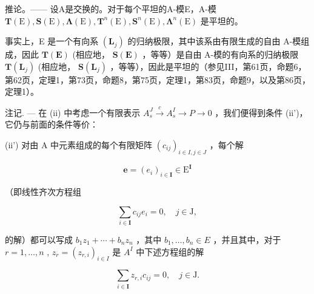 推论。—— 设A是交换的。对于每个平坦的A-模E，A-模 \(\mathbf{T}(\mathrm{E}),\mathbf{S}(\mathrm{E}),\symbf{\Lambda}(\mathrm{E}),\mathbf{T}^{n}(\mathrm{E}),\mathbf{S}^{n}(\mathrm{E}),\symbf{\Lambda}^{n}(\mathrm{E})\) 是平坦的。

事实上，E 是一个有向系 \((\mathbf{L}_{j})\) 的归纳极限，其中该系由有限生成的自由 A-模组成，因此 \(\mathbf{T}(\mathbf{E})\) (相应地， \(\mathbf{S}(\mathbf{E})\) ，等等）是自由 A-模的有向系的归纳极限 \(\mathbf{T}(\mathbf{L}_{j})\) (相应地， \(\mathbf{S}(\mathbf{L}_{j})\) ，等等），因此是平坦的（参见III，第61页，命题6，第62页，定理1，第73页，命题8，第75页，定理1，第83页，命题9，以及第86页，定理1）。

注记. --- 在 (ii) 中考虑一个有限表示 \(A_{s}^{J} \xrightarrow{c} A_{s}^{I} \to P \to 0\) ，我们便得到条件 (ii')，它仍与前面的条件等价：

(ii') 对由 A 中元素组成的每个有限矩阵 \((c_{ij})_{i\in I,j\in J}\) ，每个解

\[
\pmb {e} = (e _ {i}) _ {i \in \mathbf {I}} \in \mathrm{E} ^ {\mathbf {I}}
\]

（即线性齐次方程组

\[
\sum_ {i \in \mathbf {I}} c _ {i j} e _ {i} = 0, \quad j \in \mathrm{J},
\]

的解）都可以写成 \(b_{1}z_{1}+\cdots+b_{n}z_{n}\) ，其中 \(b_{1},\ldots,b_{n}\in E\) ，并且其中，对于 \(r=1,\ldots,n\) , \(z_{r}=(z_{r,i})_{i\in I}\) 是 \(A^{I}\) 中下述方程组的解

\[
\sum_ {i \in \mathbf {I}} z _ {r, i} c _ {i j} = 0, \quad j \in \mathrm{J}.
\]

